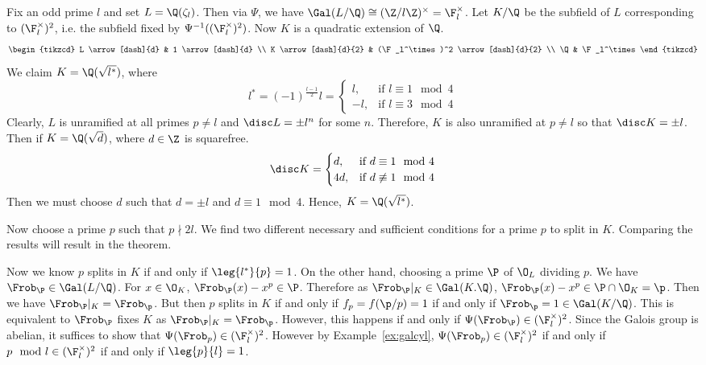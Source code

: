\qrecip

\pf Fix an odd prime $l$ and set $L=\Q(\zeta_l)$. Then via $\Psi$, we have $\Gal(L/\Q) \cong (\Z/l\Z)^\times=\F_l^\times$. Let $K/\Q$ be the subfield of $L$ corresponding to $(\F_l^\times)^2$, i.e. the subfield fixed by $\Psi^{-1}((\F_l^\times)^2)$. Now $K$ is a quadratic extension of $\Q$.
	\[
	\begin{tikzcd}
	L \arrow[dash]{d} & 1 \arrow[dash]{d} \\
	K \arrow[dash]{d}{2} & (\F_l^\times)^2 \arrow[dash]{d}{2} \\
	\Q & \F_l^\times
	\end{tikzcd}
	\]
We claim $K=\Q(\sqrt{l^*})$, where
	\[
	l^*=(-1)^{\frac{l-1}{2}} l= 
	\begin{cases}
	l, & \text{if } l \equiv 1 \mod 4 \\
	-l, & \text{if } l \equiv 3 \mod 4
	\end{cases}
	\]
Clearly, $L$ is unramified at all primes $p \neq l$ and $\disc L = \pm l^n$ for some $n$. Therefore, $K$ is also unramified at $p \neq l$ so that $\disc K= \pm l$. Then if $K=\Q(\sqrt{d})$, where $d \in \Z$ is squarefree. 
	\[
	\disc K=
	\begin{cases}
	d, & \text{if } d \equiv 1 \mod 4 \\
	4d, & \text{if } d \not\equiv 1 \mod 4
	\end{cases}
	\]
Then we must choose $d$ such that $d= \pm l$ and $d \equiv 1 \mod 4$. Hence, $K=\Q(\sqrt{l^*})$. 

Now choose a prime $p$ such that $p \nmid 2l$. We find two different necessary and sufficient conditions for a prime $p$ to split in $K$. Comparing the results will result in the theorem.

Now we know $p$ splits in $K$ if and only if $\leg{l^*}{p}=1$. On the other hand, choosing a prime $\P$ of $\O_L$ dividing $p$. We have $\Frob_\P \in \Gal(L/\Q)$. For $x \in \O_K$, $\Frob_\P(x) - x^p \in \P$. Therefore as $\Frob_\P|_K \in \Gal(K.\Q)$, $\Frob_\P(x) - x^p \in \P \cap \O_K=\p$. Then we have $\Frob_\P|_K= \Frob_\p$. But then $p$ splits in $K$ if and only if $f_p=f(\p/p)=1$ if and only if $\Frob_\p=1 \in \Gal(K/\Q)$. This is equivalent to $\Frob_\P$ fixes $K$ as $\Frob_\P|_K=\Frob_\p$. However, this happens if and only if $\Psi(\Frob_\P) \in (\F_l^\times)^2$. Since the Galois group is abelian, it suffices to show that $\Psi(\Frob_p) \in (\F_l^\times)^2$. However by Example~\ref{ex:galcyl}, $\Psi(\Frob_p) \in (\F_l^\times)^2$ if and only if $p \mod l \in (\F_l^\times)^2$ if and only if $\leg{p}{l}=1$. 

